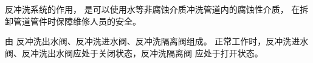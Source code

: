 



反冲洗系统的作用，
是可以使用水等非腐蚀介质冲洗管道内的腐蚀性介质，
在拆卸管道管件时保障维修人员的安全。

 由 反冲洗出水阀、反冲洗进水阀、反冲洗隔离阀组成。
    正常工作时，反冲洗进水阀、反冲洗出水阀应处于关闭状态，反冲洗隔离阀 应处于打开状态。

